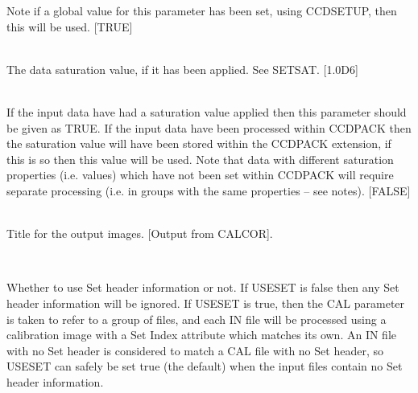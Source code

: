 \documentclass[twoside,11pt]{article}
\newcommand{\htmlref}[2]{#1}
\renewcommand{\_}{\texttt{\symbol{95}}}
\newcommand{\xroutine}[1]{\htmlref{{\sc #1}}{#1}}
\newcommand{\sstsubsection}[1]{ \item[{#1}] \mbox{} \\}
\newcommand{\sstsubsection}[1]{\item[{#1}]}
\begin{document}
{{{         Note if a global value for this parameter has been set, using
         \xroutine{CCDSETUP}, then this will be used.
         [TRUE]
      }
      \sstsubsection{
         SATURATION = \_DOUBLE (Read)
      } {
         The data saturation value, if it has been applied. See SETSAT.
         [1.0D6]
      }
      \sstsubsection{
         SETSAT = \_LOGICAL (Read)
      } {
         If the input data have had a saturation value applied then
         this parameter should be given as TRUE. If the input data
         have been processed within CCDPACK then the saturation value
         will have been stored within the CCDPACK extension, if this
         is so then this value will be used. Note that data with
         different saturation properties (i.e. values) which have not
         been set within CCDPACK will require separate processing
         (i.e. in groups with the same properties -- see notes).
         [FALSE]
      }
      \sstsubsection{
         TITLE = LITERAL (Read)
      } {
         Title for the output images.
         [Output from CALCOR].
      }
      \sstsubsection{
         USESET = \_LOGICAL (Read)
      } {
         Whether to use Set header information or not.  If USESET is
         false then any Set header information will be ignored.
         If USESET is true, then the CAL parameter is taken to
         refer to a group of files, and each IN file will be 
         processed using a calibration image with a Set Index 
         attribute which matches its own.  An IN file with no Set
         header is considered to match a CAL file with no Set header,
         so USESET can safely be set true (the default) when the 
         input files contain no Set header information.

}}}
\end{document}

